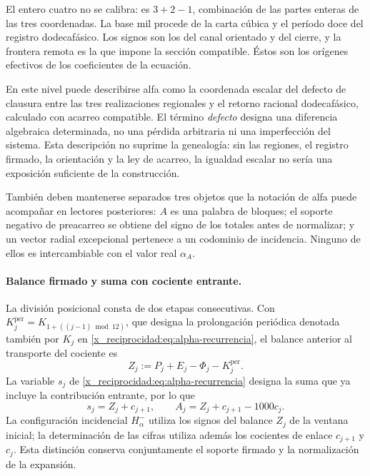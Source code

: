 El entero cuatro no se calibra: es
\(3+2-1\), combinación de las partes enteras de las tres coordenadas.
La base mil procede de la carta cúbica y el período doce del registro dodecafásico. Los
signos son los del canal orientado y del cierre, y la frontera remota es
la que impone la sección compatible. Éstos son los orígenes efectivos de
los coeficientes de la ecuación.

En este nivel puede describirse alfa como la coordenada escalar del
defecto de clausura entre las tres realizaciones regionales y el retorno
racional dodecafásico, calculado con acarreo compatible. El término
\emph{defecto} designa una diferencia algebraica determinada, no una
pérdida arbitraria ni una imperfección del sistema. Esta descripción no
suprime la genealogía: sin las regiones, el registro firmado, la
orientación y la ley de acarreo, la igualdad escalar no sería una
exposición suficiente de la construcción.

También deben mantenerse separados tres objetos que la notación de alfa
puede acompañar en lectores posteriores: \(A\) es una palabra de
bloques; el soporte negativo de preacarreo se obtiene del signo de los
totales antes de normalizar; y un vector radial excepcional pertenece a
un codominio de incidencia. Ninguno de ellos es intercambiable con el
valor real \(\alpha_A\).


\paragraph{Balance firmado y suma con cociente entrante.}
\label{x_reciprocidad:ampl-alfa-z-s-aclaracion}
La división posicional consta de dos etapas consecutivas. Con
\(K_j^{\mathrm{per}}=K_{1+((j-1)\bmod12)}\), que designa la
prolongación periódica denotada también por \(K_j\) en
\eqref{x_reciprocidad:eq:alpha-recurrencia}, el balance anterior al transporte del
cociente es
\[
 Z_j:=P_j+E_j-\Phi_j-K_j^{\mathrm{per}}.
\]
La variable $s_j$ de \eqref{x_reciprocidad:eq:alpha-recurrencia} designa la suma que ya
incluye la contribución entrante, por lo que
\[
 s_j=Z_j+c_{j+1},\qquad
 A_j=Z_j+c_{j+1}-1000c_j.
\]
La configuración incidencial
$H^-_\alpha$ utiliza los signos del balance $Z_j$ de la ventana inicial;
la determinación de las cifras utiliza además los cocientes de enlace
$c_{j+1}$ y $c_j$. Esta distinción conserva conjuntamente el soporte
firmado y la normalización de la expansión.

